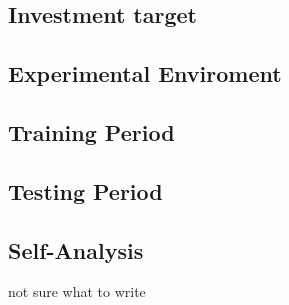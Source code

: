 \documentclass[../main.tex]{subfiles}
\begin{document}
\subsection{Investment target}


\subsection{Experimental Enviroment}


% 

\subsection{Training Period}


\subsection{Testing Period}


\subsection{Self-Analysis}
not sure what to write
\end{document}
